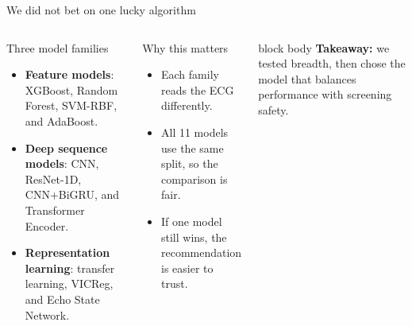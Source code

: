 \documentclass[11pt,aspectratio=169]{beamer}
\begin{document}
\begin{frame}[t]{We did not bet on one lucky algorithm}
\begin{columns}[T,onlytextwidth]
\begin{block}{Three model families}
\begin{itemize}
  \item \textbf{Feature models}: XGBoost, Random Forest, SVM-RBF, and AdaBoost.
  \item \textbf{Deep sequence models}: CNN, ResNet-1D, CNN+BiGRU, and Transformer Encoder.
  \item \textbf{Representation learning}: transfer learning, VICReg, and Echo State Network.
\end{itemize}
\end{block}

\begin{alertblock}{Why this matters}
\begin{itemize}
  \item Each family reads the ECG differently.
  \item All 11 models use the same split, so the comparison is fair.
  \item If one model still wins, the recommendation is easier to trust.
\end{itemize}
\end{alertblock}

\begin{beamercolorbox}[wd=\linewidth,rounded=true,sep=0.8em]{block body}
\textbf{Takeaway:} we tested breadth, then chose the model that balances performance with screening safety.
\end{beamercolorbox}
\end{columns}
\end{frame}
\end{document}
